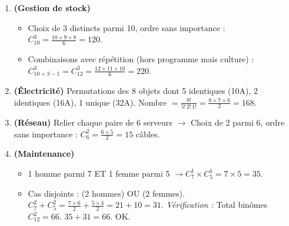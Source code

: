 \documentclass[11pt]{article}
\begin{document}
\begin{corrige}
\begin{enumerate}
    \item \textbf{(Gestion de stock)}
    \begin{itemize}
        \item[a)] Choix de 3 distincts parmi 10, ordre sans importance : $C_{10}^3 = \frac{10 \times 9 \times 8}{6} = 120$.
        \item[b)] Combinaisons avec répétition (hors programme mais culture) : $C_{10+3-1}^3 = C_{12}^3 = \frac{12 \times 11 \times 10}{6} = 220$.
    \end{itemize}
    \item \textbf{(Électricité)} Permutations des 8 objets dont 5 identiques (10A), 2 identiques (16A), 1 unique (32A).
    Nombre $= \frac{8!}{5!\,2!\,1!} = \frac{8 \times 7 \times 6}{2} = 168$.
    \item \textbf{(Réseau)} Relier chaque paire de 6 serveurs $\rightarrow$ Choix de 2 parmi 6, ordre sans importance : $C_6^2 = \frac{6 \times 5}{2} = 15$ câbles.
    \item \textbf{(Maintenance)}
    \begin{itemize}
        \item[a)] 1 homme parmi 7 ET 1 femme parmi 5 $\rightarrow C_7^1 \times C_5^1 = 7 \times 5 = 35$.
        \item[b)] Cas disjoints : (2 hommes) OU (2 femmes).
        $C_7^2 + C_5^2 = \frac{7 \times 6}{2} + \frac{5 \times 4}{2} = 21 + 10 = 31$.
        \textit{Vérification :} Total binômes $C_{12}^2 = 66$. $35 + 31 = 66$. OK.
    \end{itemize}
\end{enumerate}
\end{corrige}
\end{document}
